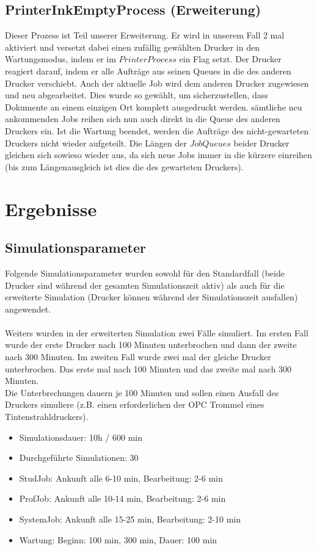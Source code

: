 \documentclass[12pt,a4paper]{article}
\begin{document}
	\subsection{PrinterInkEmptyProcess (Erweiterung)}
	Dieser Prozess ist Teil unserer Erweiterung. Er wird in unserem Fall 2 mal aktiviert und versetzt dabei einen zufällig gewählten Drucker in den Wartungsmodus, indem er im $PrinterProcess$ ein Flag setzt. 
	Der Drucker reagiert darauf, indem er alle Aufträge aus seinen Queues in die des anderen Drucker verschiebt. Auch der aktuelle Job wird dem anderen Drucker zugewiesen und neu abgearbeitet. Dies wurde 
	so gewählt, um sicherzustellen, dass Dokumente an einem einzigen Ort komplett ausgedruckt werden. sämtliche neu ankommenden Jobs reihen sich nun auch direkt in die Queue des anderen Druckers
	ein. Ist die Wartung beendet, werden die Aufträge des nicht-gewarteten Druckers nicht wieder aufgeteilt. Die Längen der $JobQueues$ beider Drucker gleichen sich sowieso wieder aus, da sich neue Jobs
	immer in die kürzere einreihen (bis zum Längenausgleich ist dies die des gewarteten Druckers).
	
	\section{Ergebnisse}
		\subsection{Simulationsparameter}
		Folgende Simulationsparameter wurden sowohl für den Standardfall (beide Drucker sind während der gesamten Simulationszeit aktiv) als auch für die erweiterte Simulation (Drucker können während der
		 Simulationszeit ausfallen) angewendet.\\
		\\
		Weiters wurden in der erweiterten Simulation zwei Fälle simuliert.
		Im ersten Fall wurde der erste Drucker nach 100 Minuten unterbrochen und dann der zweite nach 300 Minuten.
		Im zweiten Fall wurde zwei mal der gleiche Drucker unterbrochen. Das erste mal nach 100 Minuten und das zweite mal nach 300 Minuten.\\
		Die Unterbrechungen dauern je 100 Minuten und sollen einen Ausfall des Druckers simuliere (z.B. einen erforderlichen der OPC Trommel eines Tintenstrahldruckers).
		\\
			\begin{itemize}
				\item Simulationsdauer: 10h / 600 min
				\item Durchgeführte Simulationen: 30
				\item StudJob: Ankunft alle 6-10 min, Bearbeitung: 2-6 min
				\item ProfJob: Ankunft alle 10-14 min, Bearbeitung: 2-6 min
				\item SystemJob: Ankunft alle 15-25 min, Bearbeitung: 2-10 min
				\item Wartung: Beginn: 100 min, 300 min, Dauer: 100 min
			\end{itemize}	
			
\end{document}
